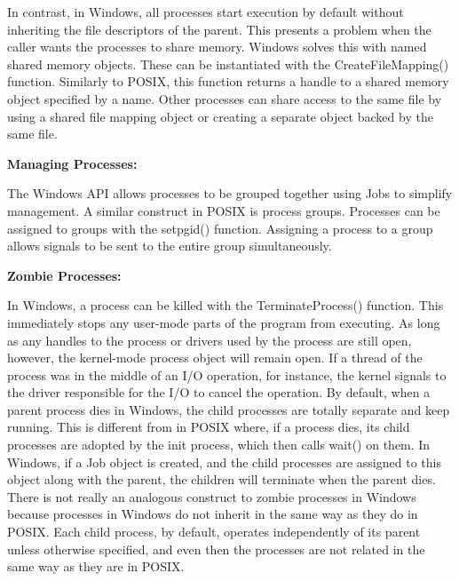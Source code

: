 \documentclass[letterpaper,10pt,titlepage]{article}
\newcommand{\ignore}[2]{\hspace{0in}#2} %
\newcommand{\tab}{\hspace*{2em}} %
\begin{document}
\begin{enumerate}
\tab In contrast, in Windows, all processes start execution by default without inheriting the file descriptors of the parent. This presents a problem when the caller wants the processes to share memory. Windows solves this with named shared memory objects. These can be instantiated with the CreateFileMapping() function. Similarly to POSIX, this function returns a handle to a shared memory object specified by a name. Other processes can share access to the same file by using a shared file mapping object or creating a separate object backed by the same file. \newline 

\textbf{Managing Processes:} \newline

The Windows API allows processes to be grouped together using Jobs to simplify management. A similar construct in POSIX is process groups. Processes can be assigned to groups with the setpgid() function. Assigning a process to a group allows signals to be sent to the entire group simultaneously. \newline

\textbf{Zombie Processes:} \newline

\tab In Windows, a process can be killed with the TerminateProcess() function. This immediately stops any user-mode parts of the program from executing. As long as any handles to the process or drivers used by the process are still open, however, the kernel-mode process object will remain open. If a thread of the process was in the middle of an I/O operation, for instance, the kernel signals to the driver responsible for the I/O to cancel the operation\ignore{http://blogs.msdn.com/b/oldnewthing/archive/2004/07/23/192531.aspx}. By default, when a parent process dies in Windows, the child processes are totally separate and keep running. This is different from in POSIX where, if a process dies, its child processes are adopted by the init process, which then calls wait() on them. In Windows, if a Job object is created, and the child processes are assigned to this object along with the parent, the children will terminate when the parent dies\ignore{http://stackoverflow.com/questions/3342941/kill-child-process-when-parent-process-is-killed}. There is not really an analogous construct to zombie processes in Windows because processes in Windows do not inherit in the same way as they do in POSIX. Each child process, by default, operates independently of its parent unless otherwise specified, and even then the processes are not related in the same way as they are in POSIX. \newline


\end{enumerate}
\end{document}
